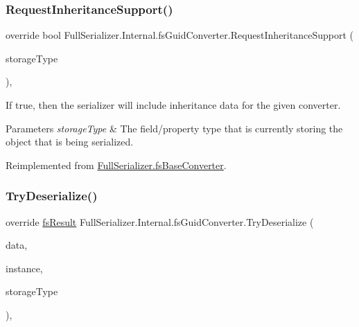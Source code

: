 \subsubsection{\texorpdfstring{Request\+Inheritance\+Support()}{RequestInheritanceSupport()}}
{\footnotesize\ttfamily override bool Full\+Serializer.\+Internal.\+fs\+Guid\+Converter.\+Request\+Inheritance\+Support (\begin{DoxyParamCaption}\item[{Type}]{storage\+Type }\end{DoxyParamCaption})\hspace{0.3cm}{\ttfamily [inline]}, {\ttfamily [virtual]}}



If true, then the serializer will include inheritance data for the given converter. 


\begin{DoxyParams}{Parameters}
{\em storage\+Type} & The field/property type that is currently storing the object that is being serialized.\\
\hline
\end{DoxyParams}


Reimplemented from \hyperlink{class_full_serializer_1_1fs_base_converter_a84447285540ab6b51efc2399d144c60c}{Full\+Serializer.\+fs\+Base\+Converter}.

\mbox{\label{class_full_serializer_1_1_internal_1_1fs_guid_converter_aea7e0849acaab5508aa34246f2702832}} 
\subsubsection{\texorpdfstring{Try\+Deserialize()}{TryDeserialize()}}
{\footnotesize\ttfamily override \hyperlink{struct_full_serializer_1_1fs_result}{fs\+Result} Full\+Serializer.\+Internal.\+fs\+Guid\+Converter.\+Try\+Deserialize (\begin{DoxyParamCaption}\item[{\hyperlink{class_full_serializer_1_1fs_data}{fs\+Data}}]{data,  }\item[{ref object}]{instance,  }\item[{Type}]{storage\+Type }\end{DoxyParamCaption})\hspace{0.3cm}{\ttfamily [inline]}, {\ttfamily [virtual]}}



